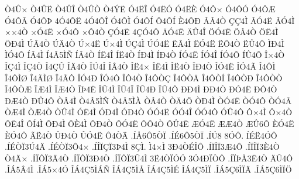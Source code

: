 {^^d24^^db^^d7
^^d24^^db^^cb
^^d24^^db^^ce
^^d24^^db^^d2
^^d24^^dd^^cb
^^d34^^cb^^ce
^^d34^^cb^^d3
^^d34^^cb^^c8
^^d34^^d4^^d7
^^d34^^d4^^d3
^^d34^^d4^^c6
^^d34^^d4^^c3
^^d34^^d4^^de
4^^d34^^d4^^cb
4^^d34^^d4^^ce
^^d34^^d4^^cc
^^d34^^d4^^cd
^^d44^^d4^^cd
^^c84^^d4^^d0
^^c2^^c24^^d2
^^c7^^c74^^cc
^^c2^^d34^^cb
^^c2^^d34^^cc
^^d7^^d74^^d2
^^d7^^d34^^cb
^^d7^^d34^^d4
^^d7^^d44^^d2
^^c7^^d34^^cb
4^^c7^^d34^^d4
^^c4^^d34^^cb
^^c4^^db4^^ce
^^d6^^d34^^cb
^^d6^^c24^^d2
^^d6^^cb4^^cc
^^d6^^d04^^cc
^^da^^c24^^d2
^^da^^c44^^d2
^^da^^d74^^cb
^^da^^d74^^cc
^^da^^c74^^cc
^^da^^d34^^cb
^^cb^^c24^^cc
^^cb^^d34^^cb
^^cb^^d44^^d2
^^cb^^db4^^d4
^^cc^^d04^^cc
^^cc^^d34^^d4
^^cd^^c24^^cc
^^cd4^^c25^^cc^^d1
^^cd^^c24^^d2
^^cd^^cb4^^ce
^^cd^^cb4^^d2
^^cd^^d04^^cc
^^cd^^d04^^d2
^^cd^^d34^^cb
^^cd^^d34^^ce
^^cd^^d34^^d4
^^cd^^db4^^d4
^^ce^^d74^^d2
^^ce^^c74^^cc
^^ce^^c74^^d2
^^ce4^^c7^^db
^^ce^^c44^^d2
^^ce^^da4^^ce
^^ce^^c24^^d2
^^ce^^cb4^^d7
^^ce^^cb4^^cc
^^ce^^cb4^^d2
^^ce^^d04^^d2
^^ce^^d34^^cb
^^ce^^d34^^c3
^^ce4^^d4^^cc
^^ce4^^d4^^cc^^d8
^^ce4^^c3^^cc^^d8
^^ce4^^c3^^d4
^^ce^^d34^^d0
^^ce^^d34^^d4
^^ce^^d44^^d2
^^ce4^^d4^^d2^^c7
^^ce4^^d4^^d2^^c4
^^ce4^^d4^^d2^^cd
^^ce4^^d4^^d2^^d0
^^ce4^^d4^^d2^^d2
^^ce4^^d4^^d2^^c6
^^ce^^c64^^cc
^^ce^^c64^^d2
^^ce^^de4^^cb
^^ce^^db4^^cc
^^ce^^db4^^ce
^^ce^^db4^^d0
^^ce^^db4^^d4
^^d0^^d04^^cc
^^d0^^d04^^d2
^^d0^^d34^^cb
^^d0^^d44^^d2
^^d0^^c64^^d2
^^d0^^db4^^d4
^^d2^^c24^^cc
^^d24^^c25^^cc^^d1
^^d24^^c25^^cc^^c0
^^d2^^c24^^d2
^^d2^^c44^^d6
^^d2^^d04^^cc
^^d2^^d34^^cb
^^d2^^d34^^d4
^^d2^^d34^^c3
^^d2^^c64^^cc
^^d2^^c64^^d2
^^d2^^db4^^cc
^^d3^^cb4^^cc
^^d3^^d04^^cc
^^d3^^d04^^d2
^^d3^^d34^^cb
^^d3^^d34^^ce
^^d3^^d34^^d4
^^d3^^db4^^d4
^^d4^^d74^^cc
^^d4^^d74^^d2
^^d4^^cb4^^ce
^^d4^^cd4^^cc
^^d4^^d04^^cc
^^d4^^c84^^cc
^^d4^^d04^^d2
^^d4^^d34^^cb
^^d4^^d44^^d2
^^d4^^db4^^cb
^^c6^^d34^^cb
^^c6^^c64^^d2
^^c6^^db6^^d4
^^c8^^d34^^cb
^^c8^^d34^^d4
^^c3^^cb4^^d2
^^db^^d04^^d2
^^db^^d34^^cb
^^d44^^d2^^c4
.^^cd^^c56^^d45^^d2^^cf
.^^cd^^c96^^d45^^d2^^cf
.^^cd^^da8
8^^d3^^d4.
^^cd^^c9^^cb4^^d3^^d4
.^^cd^^c9^^d2^^cf3^^da4^^c4
.^^cd^^c9^^d2^^cf3^^d44^^d7
.^^cd^^ce^^cf^^c7^^cf3^^de4^^cc
8^^c7^^cc.
^^cc4^^d7^^cc
3^^d04^^d2^^c9^^ce^^d4
.^^cd^^cf^^ce^^cf3^^c64^^d4
.^^cd^^cf^^ce^^cf3^^c84^^d2
^^d24^^c4^^d7
.^^cd^^cf^^d4^^cf3^^c44^^d2
.^^cd^^cf^^d4^^cf3^^d04^^d2
.^^cd^^cf^^d4^^cf3^^db4^^cc
3^^cb4^^d2^^cf^^d3^^d3
3^^d34^^d0^^cf^^d2^^d4
.^^cd^^cf^^de^^c53^^cb4^^d2
^^c4^^db4^^d4
.^^ce^^c15^^c24^^cc
.^^ce^^c15^^d74^^d3
^^ce^^c14^^c75^^cc^^c1^^d1
^^ce^^c14^^c75^^cc^^c5
^^ce^^c14^^c75^^cc^^c9
^^ce^^c14^^c75^^cc^^cf
.^^ce^^c15^^c76^^cc^^cf^^c4
.^^ce^^c15^^c76^^cc^^cf^^d6
}

